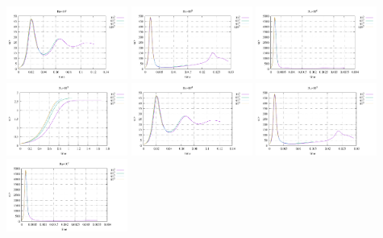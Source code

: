 \begin{center}
\includegraphics[width=3.97cm]{python_codes/fieldstone_155/results/avrg_u_Ra1e4}
\includegraphics[width=3.97cm]{python_codes/fieldstone_155/results/avrg_u_Ra1e5}
\includegraphics[width=3.97cm]{python_codes/fieldstone_155/results/avrg_u_Ra1e6}\\
\includegraphics[width=3.97cm]{python_codes/fieldstone_155/results/avrg_v_Ra1e3}
\includegraphics[width=3.97cm]{python_codes/fieldstone_155/results/avrg_v_Ra1e4}
\includegraphics[width=3.97cm]{python_codes/fieldstone_155/results/avrg_v_Ra1e5}
\includegraphics[width=3.97cm]{python_codes/fieldstone_155/results/avrg_v_Ra1e6}\\

\end{center}
